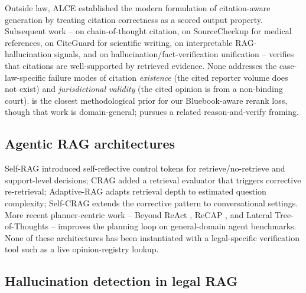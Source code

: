 \documentclass[11pt]{article}
\begin{document}
Outside law, ALCE \citep{gao2023alce} established the modern
formulation of citation-aware generation by treating citation
correctness as a scored output property. Subsequent work --
\citet{ji2024chainofthought} on chain-of-thought citation,
\citet{wu2025sourcecheckup} on SourceCheckup for medical references,
\citet{choi2025citeguard} on CiteGuard for scientific writing,
\citet{tan2025interpdetect} on interpretable RAG-hallucination signals,
and \citet{su2025unifact} on hallucination/fact-verification
unification -- verifies that citations are well-supported by retrieved
evidence. None addresses the case-law-specific failure modes of
citation \emph{existence} (the cited reporter volume does not exist)
and \emph{jurisdictional validity} (the cited opinion is from a
non-binding court). \citet{guan2025faithfulnessaware} is the closest
methodological prior for our Bluebook-aware rerank loss, though that
work is domain-general; \citet{khan2026reasonverify} pursues a related
reason-and-verify framing.

\subsection{Agentic RAG architectures}
\label{sec:related:agentic}

Self-RAG \citep{asai2023selfrag} introduced self-reflective control
tokens for retrieve/no-retrieve and support-level decisions; CRAG
\citep{yan2024crag} added a retrieval evaluator that triggers
corrective re-retrieval; Adaptive-RAG \citep{jeong2024adaptiverag}
adapts retrieval depth to estimated question complexity; Self-CRAG
\citep{anand2026selfcrag} extends the corrective pattern to
conversational settings. More recent planner-centric work -- Beyond
ReAct \citep{wei2025beyondreact}, ReCAP \citep{zhang2025recap}, and
Lateral Tree-of-Thoughts \citep{madahar2025lateraltot} -- improves the
planning loop on general-domain agent benchmarks. None of these
architectures has been instantiated with a legal-specific verification
tool such as a live opinion-registry lookup.

\subsection{Hallucination detection in legal RAG}
\label{sec:related:legalhallucination}
\end{document}
